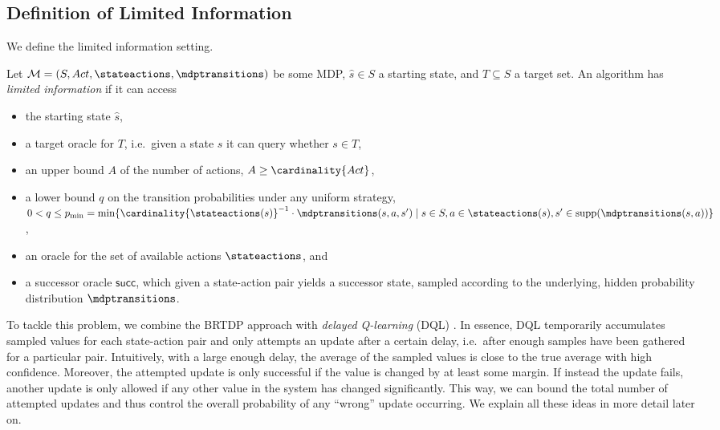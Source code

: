 \documentclass{theoretics}
\newcommand{\MDP}{\mathcal{M}}
\newcommand{\States}{S}
\newcommand{\initialstate}{\hat{s}}
\newcommand{\Actions}{Act}
\DeclareMathOperator{\support}{supp}
\newcommand{\targetset}{T}
\newcommand{\successor}{\mathsf{succ}}
\begin{document}
\subsection{Definition of Limited Information}
We define the limited information setting.
\begin{definition} \label{def:limited_information}
	Let $\MDP = (\States, \Actions, \stateactions, \mdptransitions)$ be some MDP, $\initialstate \in \States$ a starting state, and $T \subseteq \States$ a target set.
	An algorithm has \emph{limited information} if it can access
	\begin{itemize}
		\item the starting state $\initialstate$,
		\item a target oracle for $\targetset$, i.e.\ given a state $s$ it can query whether $s \in T$,
		\item an upper bound $A$ of the number of actions, $A \geq \cardinality{\Actions}$,
		\item a lower bound $q$ on the transition probabilities under any uniform strategy, $0 < q \leq p_{\min} = \min\{ \cardinality{\stateactions(s)}^{-1} \cdot \mdptransitions(s, a, s') \mid s \in \States, a \in \stateactions(s), s' \in \support(\mdptransitions(s, a)) \}$,
		\item an oracle for the set of available actions $\stateactions$, and
		\item a successor oracle $\successor$, which given a state-action pair yields a successor state, sampled according to the underlying, hidden probability distribution $\mdptransitions$.
	\end{itemize}
\end{definition}

To tackle this problem, we combine the BRTDP approach with \emph{delayed Q-learning} (DQL) \cite{DBLP:conf/icml/StrehlLWLL06}.
In essence, DQL temporarily accumulates sampled values for each state-action pair and only attempts an update after a certain delay, i.e.\ after enough samples have been gathered for a particular pair.
Intuitively, with a large enough delay, the average of the sampled values is close to the true average with high confidence.
Moreover, the attempted update is only successful if the value is changed by at least some margin.
If instead the update fails, another update is only allowed if any other value in the system has changed significantly.
This way, we can bound the total number of attempted updates and thus control the overall probability of any \enquote{wrong} update occurring.
We explain all these ideas in more detail later on.
\end{document}
